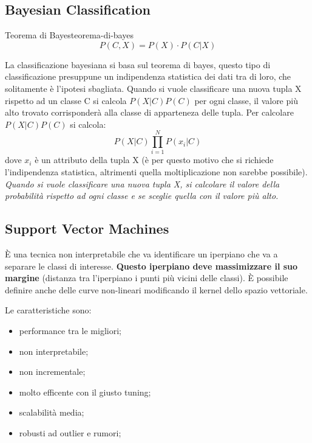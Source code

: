 \documentclass[12pt]{article}
\begin{document}
\subsection{Bayesian Classification}
\begin{theorem}{Teorema di Bayes}{teorema-di-bayes}
    \[ P(C,X) = P(X) \cdot P(C|X) \]
\end{theorem}
La classificazione bayesiana si basa sul teorema di bayes, questo tipo di classificazione presuppune un indipendenza statistica dei dati tra di loro, che solitamente \`e l'ipotesi sbagliata. Quando si vuole classificare una nuova tupla X rispetto ad un classe C si calcola $P(X|C)P(C)$ per ogni classe, il valore pi\`u alto trovato corrisponder\`a alla classe di apparteneza delle tupla. Per calcolare $P(X|C)P(C)$ si calcola:
\[ P(X|C) \prod_{i=1}^{N} P(x_i|C)  \]
dove $x_i$ \`e un attributo della tupla X (\`e per questo motivo che si richiede l'indipendenza statistica, altrimenti quella moltiplicazione non sarebbe possibile). \emph{Quando si vuole classificare una nuova tupla X, si calcolare il valore della probabilit\`a rispetto ad ogni classe e se sceglie quella con il valore pi\`u alto.}


\subsection{Support Vector Machines}
\`E una tecnica non interpretabile che va identificare un iperpiano che va a separare le classi di interesse. \textbf{Questo iperpiano deve massimizzare il suo margine} (distanza tra l'iperpiano i punti pi\`u vicini delle classi). \`E possibile definire anche delle curve non-lineari modificando il kernel dello spazio vettoriale.

Le caratteristiche sono:
\begin{itemize}
    \item performance tra le migliori;
    \item non interpretabile;
    \item non incrementale;
    \item molto efficente con il giusto tuning;
    \item scalabilit\`a media;
    \item robusti ad outlier e rumori;
\end{itemize}
\end{document}
